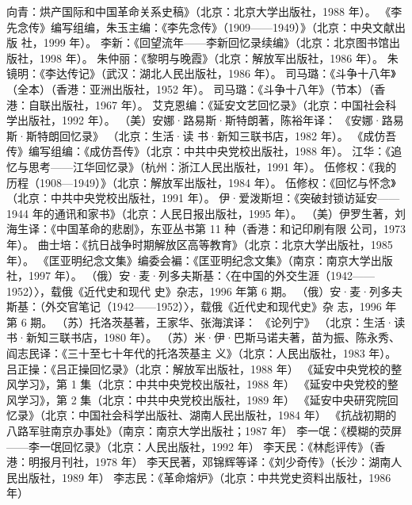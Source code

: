 \begin{thebibliography}{999}
\bibitem{} 向青：烘产国际和中国革命关系史稿》（北京：北京大学出版社，1988 年）。
\bibitem{} 《李先念传》编写组编，朱玉主编：《李先念传》（1909——1949）》（北京：中央文献出版 社，1999 年）。
\bibitem{} 李新：《回望流年——李新回忆录续编》（北京：北京图书馆出版社，1998 年）。
\bibitem{} 朱仲丽：《黎明与晚霞》（北京：解放军出版社，1986 年）。
\bibitem{} 朱镜明：《李达传记》（武汉：湖北人民出版社，1986 年）。
\bibitem{} 司马璐：《斗争十八年》（全本）（香港：亚洲出版社，1952 年）。
\bibitem{} 司马璐：《斗争十八年》（节本）（香港：自联出版社，1967 年）。
\bibitem{} 艾克恩编：《延安文艺回忆录》（北京：中国社会科学出版社，1992 年）。
\bibitem{} （美）安娜·路易斯·斯特朗著，陈裕年译： 《安娜·路易斯·斯特朗回忆录》 （北京：生活·读 书·新知三联书店，1982 年）。
\bibitem{} 《成仿吾传》编写组编：《成仿吾传》（北京：中共中央党校出版社，1988 年）。
\bibitem{} 江华：《追忆与思考——江华回忆录》（杭州：浙江人民出版社，1991 年）。
\bibitem{} 伍修权：《我的历程（1908—1949）》（北京：解放军出版社，1984 年）。
\bibitem{} 伍修权：《回忆与怀念》（北京：中共中央党校出版社，1991 年）。
\bibitem{} 伊·爱泼斯坦：《突破封锁访延安——1944 年的通讯和家书》（北京：人民日报出版社，1995 年）。
\bibitem{} （美）伊罗生著，刘海生译：《中国革命的悲剧》，东亚丛书第 11 种（香港：和记印刷有限 公司，1973 年）。
\bibitem{} 曲士培：《抗日战争时期解放区高等教育》（北京：北京大学出版社，1985 年）。
\bibitem{} 《匡亚明纪念文集》编委会褊：《匡亚明纪念文集》（南京：南京大学出版社，1997 年）。
\bibitem{} （俄）安·麦·列多夫斯基：〈在中国的外交生涯（1942——1952）〉，载俄《近代史和现代 史》杂志，1996 年第 6 期。
\bibitem{} （俄）安·麦·列多夫斯基：（外交官笔记（1942——1952）〉，载俄《近代史和现代史》杂 志，1996 年第 6 期。
\bibitem{} （苏）托洛茨基著，王家华、张海滨译： 《论列宁》 （北京：生活·读书·新知三联书店，1980 年）。
\bibitem{} （苏）米·伊·巴斯马诺夫著，苗为振、陈永秀、阎志民译：《三十至七十年代的托洛茨基主 义》（北京：人民出版社，1983 年）。
\bibitem{} 吕正操：《吕正操回忆录》（北京：解放军出版社，1988 年）
\bibitem{} 《延安中央党校的整风学习》，第 1 集（北京：中共中央党校出版社，1988 年）
\bibitem{} 《延安中央党校的整风学习》，第 2 集（北京：中共中央党校出版社，1989 年）
\bibitem{} 《延安中央研究院回忆录》（北京：中国社会科学出版社、湖南人民出版社，1984 年）
\bibitem{} 《抗战初期的八路军驻南京办事处》（南京：南京大学出版社；1987 年）
\bibitem{} 李一氓：《模糊的荧屏——李一氓回忆录》（北京：人民出版社，1992 年）
\bibitem{} 李天民：《林彪评传》（香港：明报月刊社，1978 年）
\bibitem{} 李天民著，邓锦辉等译：《刘少奇传》（长沙：湖南人民出版社，1989 年）
\bibitem{} 李志民：《革命熔炉》（北京：中共党史资料出版社，1986 年）

\end{thebibliography}
